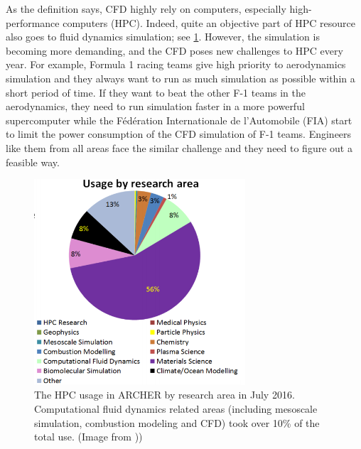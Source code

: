 As the definition says, CFD highly rely on computers, especially high-performance computers (HPC). Indeed, quite an objective part of HPC resource also goes to fluid dynamics simulation; see \ref{fig:break_down}. However, the simulation is becoming more demanding, and the CFD poses new challenges to HPC every year. For example, Formula 1 racing teams give high priority to aerodynamics simulation and they always want to run as much simulation as possible within a short period of time. If they want to beat the other F-1 teams in the aerodynamics, they need to run simulation faster in a more powerful supercomputer while the Fédération Internationale de l'Automobile (FIA) start to limit the power consumption of the CFD simulation \cite{formula1} of F-1 teams. Engineers like them from all areas face the similar challenge and they need to figure out a feasible way.

\begin{figure}[!tb]
    \centering
    \includegraphics[width=0.7\textwidth]{figures/break_down.png}
    \caption{The HPC usage in ARCHER by research area in July 2016. Computational fluid dynamics related areas (including mesoscale simulation, combustion modeling and CFD) took over 10\% of the total use. (Image from \cite{archer_use}))}
    \label{fig:break_down}
\end{figure}




